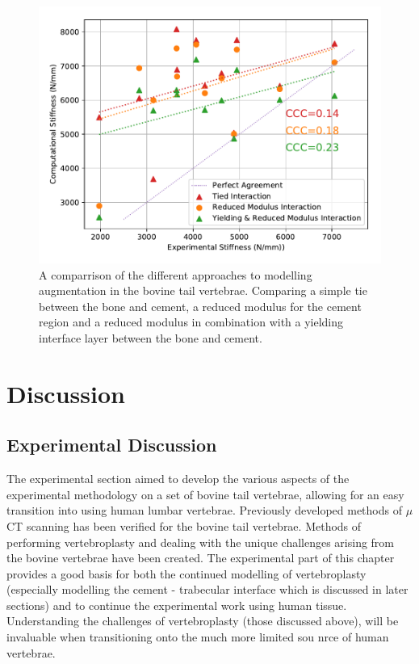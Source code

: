 \begin{figure}[ht!]
\centering
\includegraphics[width=5.3in]{images/exp_50_yield_tied.pdf}
	\caption[A comparrison of the different approaches to modelling augmentation in the bovine tail vertebrae.]{A comparrison of the different approaches to modelling augmentation in the bovine tail vertebrae. Comparing a simple tie between the bone and cement, a reduced modulus for the cement region and a reduced modulus in combination with a yielding interface layer between the bone and cement.}
	\label{fig:exp_50_yield_tied}
\end{figure}

\section{Discussion}

\subsection{Experimental Discussion}

The experimental section aimed to develop the various aspects of the
experimental methodology on a set of bovine tail vertebrae, allowing for an
easy transition into using human lumbar vertebrae.  Previously developed
methods of $\mu$CT scanning has been verified for the bovine tail vertebrae.
Methods of performing vertebroplasty and dealing with the unique challenges
arising from the bovine vertebrae have been created.  The experimental part of
this chapter provides a good basis for both the continued modelling of
vertebroplasty (especially modelling the cement - trabecular interface which is
discussed in later sections) and to continue the experimental work using human
tissue.  Understanding the challenges of vertebroplasty (those discussed
above), will be invaluable when transitioning onto the much more limited sou
nrce of human vertebrae.

